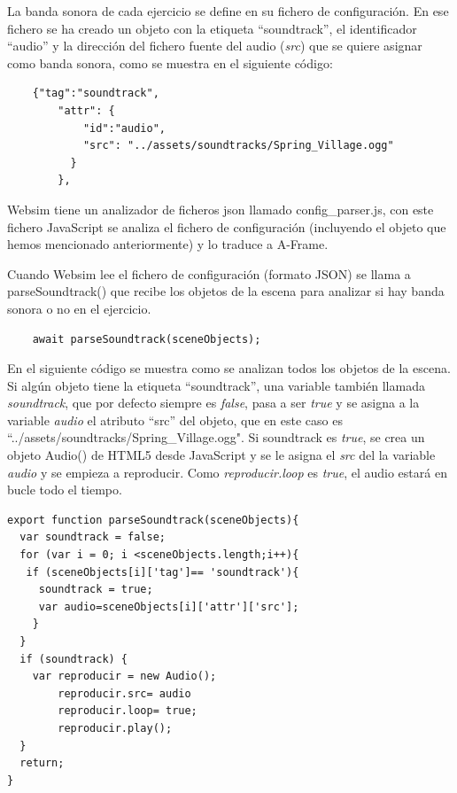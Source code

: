 La banda sonora de cada ejercicio se define en su fichero de configuración. En ese fichero se ha creado un objeto con la etiqueta ``soundtrack'', el identificador ``audio'' y la dirección del fichero fuente del audio (\textit{src}) que se quiere asignar como banda sonora, como se muestra en el siguiente código:

\begin{lstlisting}
 	{"tag":"soundtrack",
        "attr": {
            "id":"audio",
            "src": "../assets/soundtracks/Spring_Village.ogg"
          }
        },
   \end{lstlisting}

Websim tiene un analizador de ficheros json llamado config\_parser.js, con este fichero JavaScript se analiza el fichero de configuración (incluyendo el objeto que hemos mencionado anteriormente) y lo traduce a A-Frame.

Cuando Websim lee el fichero de configuración (formato JSON) se llama a parseSoundtrack() que recibe los objetos de la escena para analizar si hay banda sonora o no en el ejercicio.

\begin{lstlisting}
 	await parseSoundtrack(sceneObjects);
\end{lstlisting}

En el siguiente código se muestra como se analizan todos los objetos de la escena. Si algún objeto tiene la etiqueta ``soundtrack'', una variable también llamada \textit{soundtrack}, que por defecto siempre es \textit{false}, pasa a ser \textit{true} y se asigna a la variable \textit{audio} el atributo  ``src'' del objeto,  que en este caso es  ``../assets/soundtracks/Spring\_Village.ogg".  
Si soundtrack es \textit{true}, se crea un objeto Audio() de HTML5 desde JavaScript y se le asigna el \textit{src} del la variable \textit{audio} y se empieza a reproducir. Como \textit{reproducir.loop} es \textit{true}, el audio estará en bucle todo el tiempo.

\begin{lstlisting}
export function parseSoundtrack(sceneObjects){
  var soundtrack = false;
  for (var i = 0; i <sceneObjects.length;i++){
   if (sceneObjects[i]['tag']== 'soundtrack'){
     soundtrack = true;
     var audio=sceneObjects[i]['attr']['src'];
    }
  }
  if (soundtrack) {
    var reproducir = new Audio();
        reproducir.src= audio
        reproducir.loop= true;
        reproducir.play();
  }
  return;
}
\end{lstlisting}

